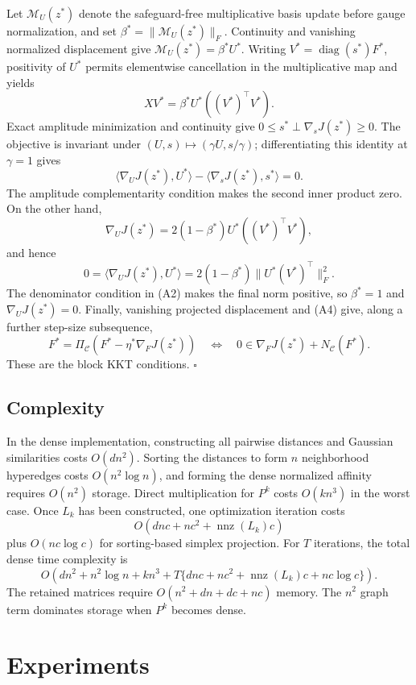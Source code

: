 \documentclass[a4paper,preprint,12pt]{elsarticle}
\theoremstyle{remark}
\newcommand{\diag}{\operatorname{diag}}
\begin{document}
Let \(\mathcal M_U(z^*)\) denote the safeguard-free multiplicative basis update before gauge normalization, and set \(\beta^*=\lVert\mathcal M_U(z^*)\rVert_F\). Continuity and vanishing normalized displacement give
$
\mathcal M_U(z^*)=\beta^*U^*.
$
Writing \(V^*=\diag(s^*)F^*\), positivity of \(U^*\) permits elementwise cancellation in the multiplicative map and yields
\[
XV^*=\beta^*U^*((V^*)^\top V^*).
\]
Exact amplitude minimization and continuity give
$
0\le s^*\perp\nabla_sJ(z^*)\ge0.
$
The objective is invariant under \((U,s)\mapsto(\gamma U,s/\gamma)\); differentiating this identity at \(\gamma=1\) gives
\[
\langle\nabla_UJ(z^*),U^*\rangle
-\langle\nabla_sJ(z^*),s^*\rangle=0.
\]
The amplitude complementarity condition makes the second inner product zero. On the other hand,
\[
\nabla_UJ(z^*)=2(1-\beta^*)U^*((V^*)^\top V^*),
\]
and hence
\[
0=\langle\nabla_UJ(z^*),U^*\rangle
=2(1-\beta^*)\lVert U^*(V^*)^\top\rVert_F^2.
\]
The denominator condition in (A2) makes the final norm positive, so \(\beta^*=1\) and \(\nabla_UJ(z^*)=0\). Finally, vanishing projected displacement and (A4) give, along a further step-size subsequence,
\[
F^*=\Pi_{\mathcal C}(F^*-\eta^*\nabla_FJ(z^*))
\quad\Longleftrightarrow\quad
0\in\nabla_FJ(z^*)+N_{\mathcal C}(F^*).
\]
These are the block KKT conditions. \(\square\)

\subsection{Complexity}

In the dense implementation, constructing all pairwise distances and Gaussian similarities costs \(O(dn^2)\). Sorting the distances to form \(n\) neighborhood hyperedges costs \(O(n^2\log n)\), and forming the dense normalized affinity requires \(O(n^2)\) storage. Direct multiplication for \(P^k\) costs \(O(kn^3)\) in the worst case. Once \(L_k\) has been constructed, one optimization iteration costs
\[
O(dnc+nc^2+\operatorname{nnz}(L_k)c)
\]
plus \(O(nc\log c)\) for sorting-based simplex projection. For \(T\) iterations, the total dense time complexity is
\[
O\!\left(dn^2+n^2\log n+kn^3
+T\{dnc+nc^2+\operatorname{nnz}(L_k)c+nc\log c\}\right).
\]
The retained matrices require \(O(n^2+dn+dc+nc)\) memory. The \(n^2\) graph term dominates storage when \(P^k\) becomes dense.

\section{Experiments}
\end{document}
